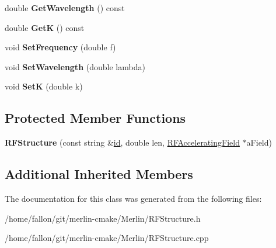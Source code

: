 \begin{DoxyCompactItemize}
double {\bfseries Get\+Wavelength} () const
\item 
\mbox{\label{classRFStructure_abca7f94064b1df4e5c33418372d6b4aa}} 
double {\bfseries GetK} () const
\item 
\mbox{\label{classRFStructure_a325c43f6b384dcdfb0301e454397f49a}} 
void {\bfseries Set\+Frequency} (double f)
\item 
\mbox{\label{classRFStructure_aeb319dbc9c006d224b02ce3da8bb0e94}} 
void {\bfseries Set\+Wavelength} (double lambda)
\item 
\mbox{\label{classRFStructure_ad67d5f564bb9e8ef5b6eec29ce31f990}} 
void {\bfseries SetK} (double k)
\end{DoxyCompactItemize}
\subsection*{Protected Member Functions}
\begin{DoxyCompactItemize}
\item 
\mbox{\label{classRFStructure_adfcf8bac081b7970ae3d601b300b7149}} 
{\bfseries R\+F\+Structure} (const string \&\hyperlink{classModelElement_aada171ead2085c75b592cf07d91bc5c2}{id}, double len, \hyperlink{classRFAcceleratingField}{R\+F\+Accelerating\+Field} $\ast$a\+Field)
\end{DoxyCompactItemize}
\subsection*{Additional Inherited Members}


The documentation for this class was generated from the following files\+:\begin{DoxyCompactItemize}
\item 
/home/fallon/git/merlin-\/cmake/\+Merlin/R\+F\+Structure.\+h\item 
/home/fallon/git/merlin-\/cmake/\+Merlin/R\+F\+Structure.\+cpp\end{DoxyCompactItemize}
